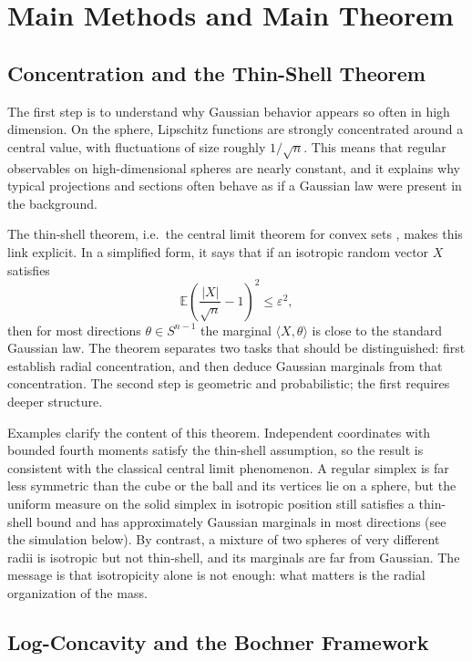 \documentclass[10pt]{article}
\begin{document}
\section{Main Methods and Main Theorem}

\subsection{Concentration and the Thin-Shell Theorem}

The first step is to understand why Gaussian behavior appears so often in high dimension. On the sphere, Lipschitz functions are strongly concentrated around a central value, with fluctuations of size roughly $1/\sqrt{n}$. This means that regular observables on high-dimensional spheres are nearly constant, and it explains why typical projections and sections often behave as if a Gaussian law were present in the background.

The thin-shell theorem, i.e.\ the central limit theorem for convex sets \cite{ABP03,Kla07}, makes this link explicit. In a simplified form, it says that if an isotropic random vector $X$ satisfies
\[
\mathbb{E}\left(\frac{|X|}{\sqrt{n}}-1\right)^2\leq \varepsilon^2,
\]
then for most directions $\theta\in S^{n-1}$ the marginal $\langle X,\theta\rangle$ is close to the standard Gaussian law. The theorem separates two tasks that should be distinguished: first establish radial concentration, and then deduce Gaussian marginals from that concentration. The second step is geometric and probabilistic; the first requires deeper structure.

Examples clarify the content of this theorem. Independent coordinates with bounded fourth moments satisfy the thin-shell assumption, so the result is consistent with the classical central limit phenomenon. A regular simplex is far less symmetric than the cube or the ball and its vertices lie on a sphere, but the uniform measure on the solid simplex in isotropic position still satisfies a thin-shell bound and has approximately Gaussian marginals in most directions (see the simulation below). By contrast, a mixture of two spheres of very different radii is isotropic but not thin-shell, and its marginals are far from Gaussian. The message is that isotropicity alone is not enough: what matters is the radial organization of the mass.

\subsection{Log-Concavity and the Bochner Framework}
\end{document}
